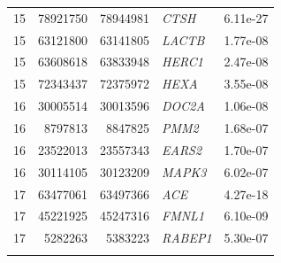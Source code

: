 \begin{longtable}{rrrlr}
   15 & 78921750 & 78944981 & \textit{CTSH} & 6.11e-27 \\ 
   15 & 63121800 & 63141805 & \textit{LACTB} & 1.77e-08 \\ 
   15 & 63608618 & 63833948 & \textit{HERC1} & 2.47e-08 \\ 
   15 & 72343437 & 72375972 & \textit{HEXA} & 3.55e-08 \\ 
   16 & 30005514 & 30013596 & \textit{DOC2A} & 1.06e-08 \\ 
   16 & 8797813 & 8847825 & \textit{PMM2} & 1.68e-07 \\ 
   16 & 23522013 & 23557343 & \textit{EARS2} & 1.70e-07 \\ 
   16 & 30114105 & 30123209 & \textit{MAPK3} & 6.02e-07 \\ 
   17 & 63477061 & 63497366 & \textit{ACE} & 4.27e-18 \\ 
   17 & 45221925 & 45247316 & \textit{FMNL1} & 6.10e-09 \\ 
   17 & 5282263 & 5383223 & \textit{RABEP1} & 5.30e-07 \\ 
   \bottomrule
\label{tab:cistrans-PWAS_riskgenes}
\end{longtable}
\pagebreak

